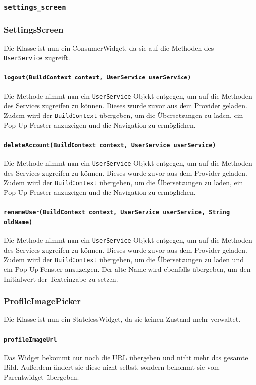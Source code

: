 \documentclass{implementierungsheft}
\begin{document}
\subsubsection{\texttt{settings\_screen}}
\subsubsection*{SettingsScreen}
Die Klasse ist nun ein ConsumerWidget, da sie auf die Methoden des \texttt{UserService} zugreift.
\paragraph{\texttt{logout(BuildContext context, UserService userService)}}
Die Methode nimmt nun ein \texttt{UserService} Objekt entgegen, um auf die Methoden des Services zugreifen zu können. Dieses wurde zuvor aus dem Provider geladen. Zudem wird der \texttt{BuildContext} übergeben, um die Übersetzungen zu laden, ein Pop-Up-Fenster anzuzeigen und die Navigation zu ermöglichen.
\paragraph{\texttt{deleteAccount(BuildContext context, UserService userService)}}
Die Methode nimmt nun ein \texttt{UserService} Objekt entgegen, um auf die Methoden des Services zugreifen zu können. Dieses wurde zuvor aus dem Provider geladen. Zudem wird der \texttt{BuildContext} übergeben, um die Übersetzungen zu laden, ein Pop-Up-Fenster anzuzeigen und die Navigation zu ermöglichen.
\paragraph{\texttt{renameUser(BuildContext context, UserService userService, String oldName)}}
Die Methode nimmt nun ein \texttt{UserService} Objekt entgegen, um auf die Methoden des Services zugreifen zu können. Dieses wurde zuvor aus dem Provider geladen. Zudem wird der \texttt{BuildContext} übergeben, um die Übersetzungen zu laden und ein Pop-Up-Fenster anzuzeigen. Der alte Name wird ebenfalls übergeben, um den Initialwert der Texteingabe zu setzen.
\subsubsection*{ProfileImagePicker}
Die Klasse ist nun ein StatelessWidget, da sie keinen Zustand mehr verwaltet.
\paragraph{\texttt{profileImageUrl}}
Das Widget bekommt nur noch die URL übergeben und nicht mehr das gesamte Bild. Außerdem ändert sie diese nicht selbst, sondern bekommt sie vom Parentwidget übergeben.
\end{document}
